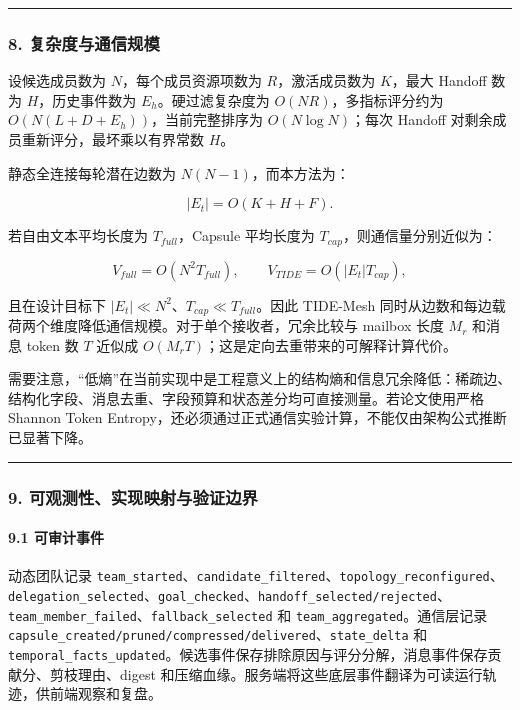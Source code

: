 \documentclass[UTF8,a4paper,12pt]{ctexart}
\begin{document}
\begin{center}\rule{0.5\linewidth}{0.5pt}\end{center}

\subsubsection{8. 复杂度与通信规模}

设候选成员数为 \(N\)，每个成员资源项数为 \(R\)，激活成员数为 \(K\)，最大 Handoff 数为 \(H\)，历史事件数为 \(E_h\)。硬过滤复杂度为 \(O(NR)\)，多指标评分约为 \(O(N(L+D+E_h))\)，当前完整排序为 \(O(N\log N)\)；每次 Handoff 对剩余成员重新评分，最坏乘以有界常数 \(H\)。

静态全连接每轮潜在边数为 \(N(N-1)\)，而本方法为：

\[
|E_t|=O(K+H+F).
\]

若自由文本平均长度为 \(T_{full}\)，Capsule 平均长度为 \(T_{cap}\)，则通信量分别近似为：

\[
V_{full}=O(N^2T_{full}),\qquad
V_{TIDE}=O(|E_t|T_{cap}),
\]

且在设计目标下 \(|E_t|\ll N^2\)、\(T_{cap}\ll T_{full}\)。因此 TIDE-Mesh 同时从边数和每边载荷两个维度降低通信规模。对于单个接收者，冗余比较与 mailbox 长度 \(M_r\) 和消息 token 数 \(T\) 近似成 \(O(M_rT)\)；这是定向去重带来的可解释计算代价。

需要注意，``低熵''在当前实现中是工程意义上的结构熵和信息冗余降低：稀疏边、结构化字段、消息去重、字段预算和状态差分均可直接测量。若论文使用严格 Shannon Token Entropy，还必须通过正式通信实验计算，不能仅由架构公式推断已显著下降。

\begin{center}\rule{0.5\linewidth}{0.5pt}\end{center}

\subsubsection{9. 可观测性、实现映射与验证边界}

\paragraph{9.1 可审计事件}

动态团队记录 \texttt{team\_started}、\texttt{candidate\_filtered}、\texttt{topology\_reconfigured}、\texttt{delegation\_selected}、\texttt{goal\_checked}、\texttt{handoff\_selected/rejected}、\texttt{team\_member\_failed}、\texttt{fallback\_selected} 和 \texttt{team\_aggregated}。通信层记录 \texttt{capsule\_created/pruned/compressed/delivered}、\texttt{state\_delta} 和 \texttt{temporal\_facts\_updated}。候选事件保存排除原因与评分分解，消息事件保存贡献分、剪枝理由、digest 和压缩血缘。服务端将这些底层事件翻译为可读运行轨迹，供前端观察和复盘。
\end{document}
